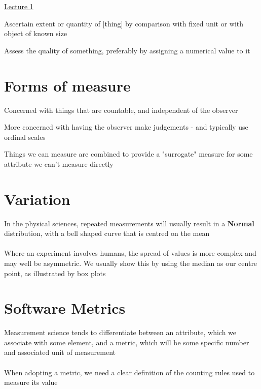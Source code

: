 \documentclass{article}[18pt]
\begin{document}
\begin{center}
\underline{\huge Lecture 1}
\end{center}
\begin{definition}[Measure]
Ascertain extent or quantity of [thing] by comparison with fixed unit or with object of known size
\end{definition}
\begin{definition}[Evaluate]
Assess the quality of something, preferably by assigning a numerical value to it
\end{definition}
\section{Forms of measure}
\begin{definition}[Quantitative]
Concerned with things that are countable, and independent of the observer
\end{definition}
\begin{definition}[Qualitative]
More concerned with having the observer make judgements - and typically use ordinal scales
\end{definition}
\begin{definition}
Things we can measure are combined to provide a "surrogate" measure for some attribute we can't measure directly
\end{definition}
\section{Variation}
In the physical sciences, repeated measurements will usually result in a \textbf{Normal} distribution, with a bell shaped curve that is centred on the mean\\
\\
Where an experiment involves humans, the spread of values is more complex and may well be asymmetric. We usually show this by using the median as our centre point, as illustrated by box plots
\section{Software Metrics}
Measurement science tends to differentiate between an attribute, which we associate with some element, and a metric, which will be some specific number and associated unit of measurement\\
\\
When adopting a metric, we need a clear definition of the counting rules used to measure its value
\end{document}
